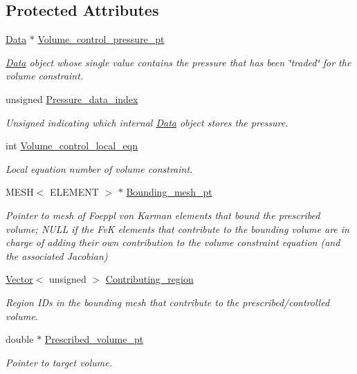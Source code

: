 \subsection*{Protected Attributes}
\begin{DoxyCompactItemize}
\item 
\hyperlink{classoomph_1_1Data}{Data} $\ast$ \hyperlink{classoomph_1_1FoepplvonKarmanVolumeConstraintElement_a15515003602f6303d5798b3553331fac}{Volume\+\_\+control\+\_\+pressure\+\_\+pt}
\begin{DoxyCompactList}\small\item\em \hyperlink{classoomph_1_1Data}{Data} object whose single value contains the pressure that has been \char`\"{}traded\char`\"{} for the volume constraint. \end{DoxyCompactList}\item 
unsigned \hyperlink{classoomph_1_1FoepplvonKarmanVolumeConstraintElement_a3881d17c5bdda4a71815f1fedfeb4185}{Pressure\+\_\+data\+\_\+index}
\begin{DoxyCompactList}\small\item\em Unsigned indicating which internal \hyperlink{classoomph_1_1Data}{Data} object stores the pressure. \end{DoxyCompactList}\item 
int \hyperlink{classoomph_1_1FoepplvonKarmanVolumeConstraintElement_a0c3ee6a6c6c4f5eb93f9540c6d400f26}{Volume\+\_\+control\+\_\+local\+\_\+eqn}
\begin{DoxyCompactList}\small\item\em Local equation number of volume constraint. \end{DoxyCompactList}\item 
M\+E\+SH$<$ E\+L\+E\+M\+E\+NT $>$ $\ast$ \hyperlink{classoomph_1_1FoepplvonKarmanVolumeConstraintElement_a0bebd0ba7ecef23139c97ed56ee83b71}{Bounding\+\_\+mesh\+\_\+pt}
\begin{DoxyCompactList}\small\item\em Pointer to mesh of Foeppl von Karman elements that bound the prescribed volume; N\+U\+LL if the FvK elements that contribute to the bounding volume are in charge of adding their own contribution to the volume constraint equation (and the associated Jacobian) \end{DoxyCompactList}\item 
\hyperlink{classoomph_1_1Vector}{Vector}$<$ unsigned $>$ \hyperlink{classoomph_1_1FoepplvonKarmanVolumeConstraintElement_ab7504a6d7b951b3a8c0580acddd4d3b0}{Contributing\+\_\+region}
\begin{DoxyCompactList}\small\item\em Region I\+Ds in the bounding mesh that contribute to the prescribed/controlled volume. \end{DoxyCompactList}\item 
double $\ast$ \hyperlink{classoomph_1_1FoepplvonKarmanVolumeConstraintElement_a47b9920b4fe975f324d6ff0aca6d325b}{Prescribed\+\_\+volume\+\_\+pt}
\begin{DoxyCompactList}\small\item\em Pointer to target volume. \end{DoxyCompactList}\end{DoxyCompactItemize}
